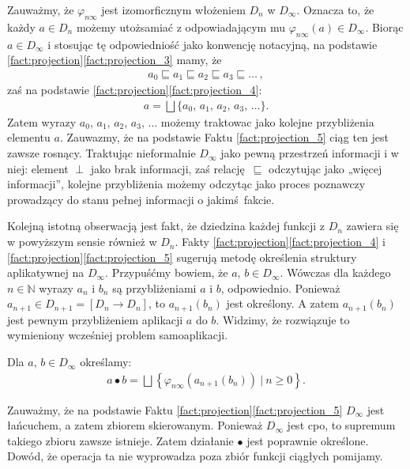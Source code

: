 Zauważmy, że \(\varphi_{n\infty}\) jest izomorficznym włożeniem \(D_n\) w \(D_\infty\). Oznacza to, że każdy \(a\in D_n\) możemy utożsamiać z odpowiadającym mu \(\varphi_{n\infty}(a)\in D_\infty\). Biorąc \(a\in D_\infty\) i stosując tę odpowiedniość jako konwencję notacyjną, na podstawie \ref{fact:projection}\ref{fact:projection_3} mamy, że
\begin{align*}
 a_0 \sqsubseteq  a_1 \sqsubseteq a_2 \sqsubseteq a_3 \sqsubseteq \dots\,,
\end{align*}
zaś na podstawie \ref{fact:projection}\ref{fact:projection_4}:
\begin{align*}
  a=\bigsqcup\{a_0,\,a_1,\,a_2,\,a_3,\,\dots\}.
\end{align*}
Zatem wyrazy \(a_0,\,a_1,\,a_2,\,a_3,\,\dots\) możemy traktowac jako kolejne przybliżenia elementu \(a\). Zauwazmy, że na podstawie Faktu \ref{fact:projection_5} ciąg ten jest zawsze rosnący. Traktując nieformalnie \(D_\infty\) jako pewną przestrzeń informacji i w niej: element \(\perp\) jako brak informacji, zaś relację \(\sqsubseteq\) odczytując jako „więcej informacji”, kolejne przybliżenia możemy odczytąc jako proces poznawczy prowadzący do stanu pełnej informacji o jakimś fakcie.  

Kolejną istotną obserwacją jest fakt, że dziedzina każdej funkcji z \(D_n\) zawiera się w powyższym sensie również w \(D_n\). Fakty \ref{fact:projection}\ref{fact:projection_4} i \ref{fact:projection}\ref{fact:projection_5} sugerują metodę określenia struktury aplikatywnej na \(D_\infty\). Przypuśćmy bowiem, że \(a,\,b\in D_\infty\). Wówczas dla każdego \(n\in\mathbb{N}\) wyrazy \(a_n\) i \(b_n\) są przybliżeniami \(a\) i \(b\), odpowiednio. Ponieważ \(a_{n+1}\in  D_{n+1}=[D_n\to D_n]\), to \(a_{n+1}(b_n)\) jest określony. A zatem \(a_{n+1}(b_n)\) jest pewnym przybliżeniem aplikacji \(a\) do \(b\). Widzimy, że rozwiązuje to wymieniony wcześniej problem samoaplikacji. 

\begin{definicja}%
  Dla \(a,\,b\in D_\infty\) określamy:
\begin{align*}
a \bullet b = \bigsqcup\left\{\varphi_{n\infty}(a_{n+1}(b_n))\ |\ n\geq 0\right\}.%
\end{align*}
\end{definicja}

Zauważmy, że na podstawie Faktu \ref{fact:projection}\ref{fact:projection_5} \(D_\infty\) jest łańcuchem, a zatem zbiorem skierowanym. Ponieważ \(D_\infty\) jest cpo, to supremum takiego zbioru zawsze istnieje. Zatem działanie \(\bullet\) jest poprawnie określone.
Dowód, że operacja ta nie wyprowadza poza zbiór funkcji ciągłych pomijamy. 

